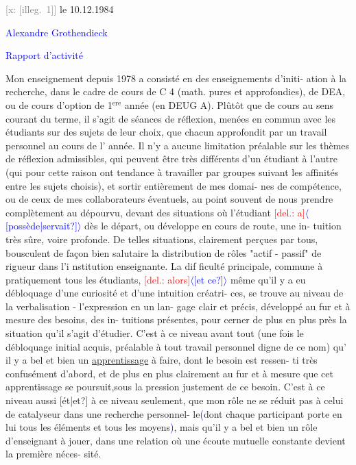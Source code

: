\documentclass[11pt]{article}
\newcommand{\scanpage}[1]{\par\bigskip\noindent{\small\sffamily[scan #1]}\par}
\newcommand{\mspage}[1]{{\small\sffamily[p.\,#1]}}
\newcommand{\hand}[1]{\textcolor{blue}{#1}}
\newcommand{\inserted}[2][]{\textcolor{blue}{$\langle$#2$\rangle$}}
\newcommand{\deleted}[1]{\textcolor{red}{[\textsf{del.:} #1]}}
\newcommand{\xout}[1]{\textcolor{gray}{[\textsf{x:} #1]}}
\newcommand{\uline}[1]{\underline{#1}}
\newcommand{\unsure}[1]{[#1?]}
\newcommand{\illegible}[1]{[\textsf{illeg.\ #1}]}
\begin{document}
\xout{\illegible{1}} le 10.12.1984

\hand{Alexandre Grothendieck}

\mspage{139}

\clearpage
\scanpage{119/141}
\hand{Rapport d'activité}

Mon enseignement depuis 1978 a consisté en des enseignements d'initi-%
ation à la recherche, dans le cadre de cours de C 4 (math. pures et
approfondies), de DEA, ou de cours d'option de 1$^{\text{ere}}$ année (en DEUG A).
Plûtôt que de cours au sens courant du terme, il s'agit de séances de
réflexion, menées en commun avec les étudiants sur des sujets de leur
choix, que chacun approfondit par un travail personnel au cours de l'
année. Il n'y a aucune limitation préalable sur les thèmes de réflexion
admissibles, qui peuvent être très différents d'un étudiant à l'autre
(qui pour cette raison ont tendance à travailler par groupes suivant les
affinités entre les sujets choisis), et sortir entièrement de mes domai-%
nes de compétence, ou de ceux de mes collaborateurs éventuels, au point
souvent de nous prendre complètement au dépourvu, devant des situations
où l'étudiant \deleted{a}\inserted{\unsure{possède|servait}} dès le départ, ou développe en cours de route, une in-%
tuition très sûre, voire profonde. De telles situations, clairement
perçues par tous, bousculent de façon bien salutaire la distribution de
rôles "actif - passif" de rigueur dans l'i nstitution enseignante. La dif
ficulté principale, commune à pratiquement tous les étudiants, \deleted{alors}\inserted{\unsure{et ce}}
même qu'il y a eu débloquage d'une curiosité et d'une intuition créatri-%
ces, se trouve au niveau de la verbalisation - l'expression en un lan-%
gage clair et précis, développé au fur et à mesure des besoins, des in-%
tuitions présentes, pour cerner de plus en plus près la situation qu'il
s'agit d'étudier. C'est à ce niveau avant tout (une fois le débloquage
initial acquis, préalable à tout travail personnel digne de ce nom) qu'
il y a bel et bien un \uline{apprentissage} à faire, dont le besoin est ressen-%
ti très confusément d'abord, et de plus en plus clairement au fur et à
mesure que cet apprentissage se poursuit,sous la pression justement de
ce besoin. C'est à ce niveau aussi \unsure{ét|et} à ce niveau seulement, que mon
rôle ne se réduit pas à celui de catalyseur dans une recherche personnel-%
le\hand{(}dont chaque participant porte en lui tous les éléments et tous les
moyens\hand{)}, mais qu'il y a bel et bien un rôle d'enseignant à jouer, dans
une relation où une écoute mutuelle constante devient la première néces-%
sité.
\end{document}
